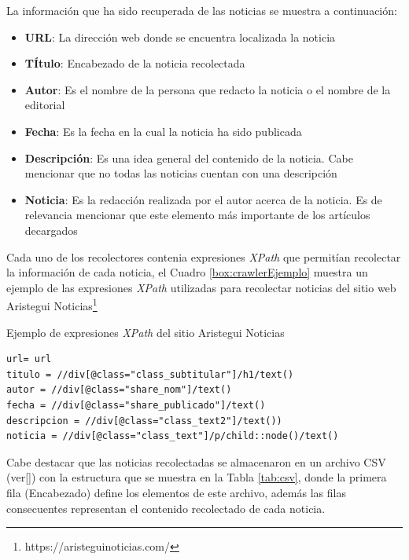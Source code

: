 La información que ha sido recuperada de las noticias se muestra a continuación:
\begin{itemize}
	\item \textbf{URL}: La dirección web donde se encuentra localizada la noticia 
	\item \textbf{TÍtulo}: Encabezado de la noticia recolectada
	\item \textbf{Autor}: Es el nombre de la persona que redacto la noticia o el nombre de la editorial
	\item \textbf{Fecha}: Es la fecha en la cual la noticia ha sido publicada
	\item \textbf{Descripción}: Es una idea general del contenido de la noticia. Cabe mencionar que no todas las noticias cuentan con una descripción
	\item \textbf{Noticia}: Es la redacción realizada por el autor acerca de la noticia. Es de relevancia mencionar que este elemento más importante de los artículos decargados 
\end{itemize}

Cada uno de los recolectores contenia expresiones \textit{XPath} que permitían recolectar la información de cada noticia, el Cuadro \ref{box:crawlerEjemplo} muestra un ejemplo de las expresiones \textit{XPath} utilizadas para recolectar noticias del sitio web Aristegui Noticias\footnote{https://aristeguinoticias.com/}\\

\begin{mygraybox}[label={box:crawlerEjemplo}]{Ejemplo de expresiones \textit{XPath} del sitio Aristegui Noticias}
\begin{small}
\begin{verbatim}
url= url
titulo = //div[@class="class_subtitular"]/h1/text()
autor = //div[@class="share_nom"]/text()
fecha = //div[@class="share_publicado"]/text()
descripcion = //div[@class="class_text2"]/text())
noticia = //div[@class="class_text"]/p/child::node()/text()
\end{verbatim}
\end{small}
\end{mygraybox}

Cabe destacar que las noticias recolectadas se almacenaron en un archivo CSV (ver\ref{}) con la estructura que se muestra en la Tabla \ref{tab:csv}, donde la primera fila (Encabezado) define los elementos de este archivo, además las filas consecuentes representan el contenido recolectado de cada noticia.\\

